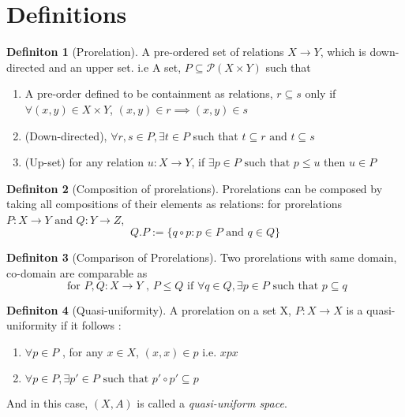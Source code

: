 \documentclass[18pt,a4paper]{article}
\theoremstyle{definition}
\newtheorem{definition}{Definiton}[section]
\begin{document}
\section{Definitions}%
\label{sec:definitions}

\begin{definition}[Prorelation] %

A pre-ordered set of relations $X \to Y$, which is down-directed and an upper set. i.e
A set, $P \subseteq \mathcal{P}(X \times Y)$ such that
	\begin{enumerate}[label=(\roman*)]
		\item A pre-order defined to be containment as relations, $r \subseteq s$
			only if $\forall (x,y) \in X \times Y$, $(x,y) \in r \implies (x,y)\in s$
		\item (Down-directed), $\forall r,s \in P, \exists t \in P $ such that
			$t\subseteq r \text{ and } t \subseteq s$
		\item (Up-set) for any relation $u:X\to Y$, if $\exists p \in P \text{ such that } p\leq u $
			then $u \in P$
\end{enumerate} \end{definition}
\begin{definition}[Composition of prorelations] %
	Prorelations can be composed by taking all compositions of their elements as relations:
	for prorelations $P:X\to Y \text{ and } Q:Y\to Z$,
	\[ Q.P:=\{q \circ p : p \in P \text{ and } q \in Q  \} \]
\end{definition}
\begin{definition}[Comparison of Prorelations] %
Two prorelations with same domain, co-domain are comparable as
\[ \text{ for }  P,Q:X \to Y \text{ , } P \leq Q \text{ if } \forall q \in Q, \exists p \in P
\text{ such that } p \subseteq q    \]
\end{definition}
\begin{definition}[Quasi-uniformity] %
A prorelation on a set X, $P:X \to X$ is a quasi-uniformity if it follows :
\begin{enumerate}[label=\roman*]
	\item $\forall p \in P $ , for any $x \in X$, $(x,x) \in p$ i.e. $xpx$
	\item $\forall p \in P, \exists p' \in P \text{ such that } p' \circ p' \subseteq p$
\end{enumerate}
And in this case, $(X,A)$ is called a \textit{quasi-uniform space}.
\end{definition}
\end{document}
